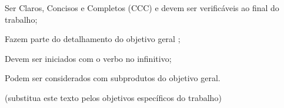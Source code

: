 Ser Claros, Concisos e Completos (CCC) e devem ser verificáveis ao final do trabalho;

Fazem parte do detalhamento do objetivo geral ;

Devem ser iniciados com o verbo no infinitivo;

Podem ser considerados com subprodutos do objetivo geral.

(substitua este texto pelos objetivos específicos do trabalho)

  


% 
% 
% 
% 
% 
% 
% 
% 
% 
